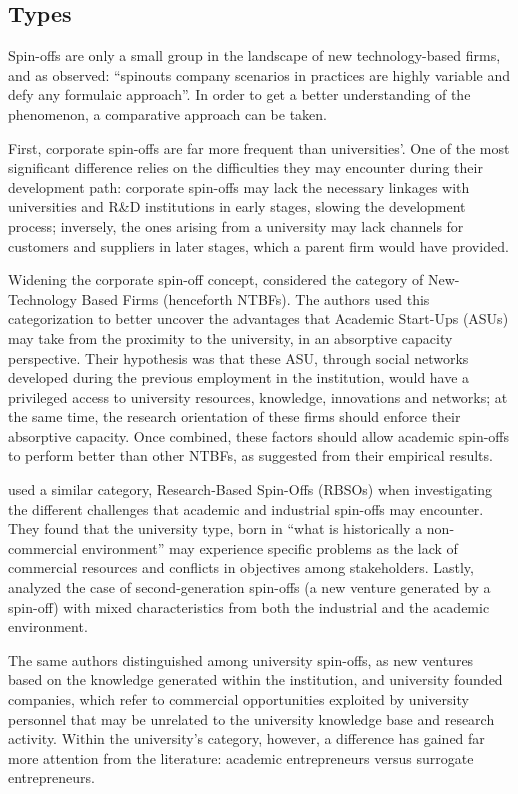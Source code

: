 \subsection{Types}

Spin-offs are only a small group in the landscape of new technology-based firms, and as \citet{Franklin2001} observed: \enquote{spinouts company scenarios in practices are highly variable and defy any formulaic approach}. In order to get a better understanding of the phenomenon, a comparative approach can be taken.

First, corporate spin-offs are far more frequent than universities'. One of the most significant difference relies on the difficulties they may encounter during their development path: corporate spin-offs may lack the necessary linkages with universities and R\&D institutions in early stages, slowing the development process; inversely, the ones arising from a university may lack channels for customers and suppliers in later stages, which a parent firm would have provided.

Widening the corporate spin-off concept, \citet{Colombo2010} considered the category of New-Technology Based Firms (henceforth NTBFs). The authors used this categorization to better uncover the advantages that Academic Start-Ups (ASUs) may take from the proximity to the university, in an absorptive capacity perspective. Their hypothesis was that these ASU, through social networks developed during the previous employment in the institution, would have a privileged access to university resources, knowledge, innovations and networks; at the same time, the research orientation of these firms should enforce their absorptive capacity. Once combined, these factors should allow academic spin-offs to perform better than other NTBFs, as suggested from their empirical results.

\citet{Mustar2006} used a similar category, Research-Based Spin-Offs (RBSOs) when investigating the different challenges that academic and industrial spin-offs may encounter. They found that the university type, born in \enquote{what is historically a non-commercial environment} may experience specific problems as the lack of commercial resources and conflicts in objectives among stakeholders. Lastly, \citet{Leitch2005} analyzed the case of  second-generation spin-offs (a new venture generated by a spin-off) with mixed characteristics from both the industrial and the academic environment.

The same authors distinguished among university spin-offs, as new ventures based on the knowledge generated within the institution, and university founded companies, which refer to commercial opportunities exploited by university personnel that may be unrelated to the university knowledge base and research activity. Within the university's category, however, a difference has gained far more attention from the literature: academic entrepreneurs versus surrogate entrepreneurs.

